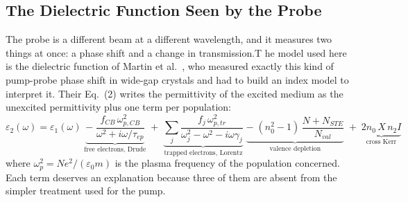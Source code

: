 


\subsection{The Dielectric Function Seen by the Probe}

The probe is a different beam at a different wavelength, and it measures two things at once: a phase shift and a change in transmission.T he model used here is the dielectric function of Martin et al.~\cite{martin1997}, who measured exactly this kind of pump-probe phase shift in wide-gap crystals and had to build an index model to interpret it. Their Eq.~(2) writes the permittivity of the excited medium as the unexcited permittivity plus one term per population:
\begin{equation}
\label{eq:martin_eps}
\varepsilon_2(\omega) = \varepsilon_1(\omega)
\;\underbrace{-\;\frac{f_{CB}\,\omega_{p,CB}^2}{\omega^2 + i\omega/\tau_{ep}}}_{\text{free electrons, Drude}}
\;+\;\underbrace{\sum_j \frac{f_j\,\omega_{p,tr}^2}{\omega_j^2-\omega^2-i\omega\gamma_j}}_{\text{trapped electrons, Lorentz}}
\;\underbrace{-\;(n_0^2-1)\,\frac{N+N_{STE}}{N_{val}}}_{\text{valence depletion}}
\;+\;\underbrace{2n_0\,X\,n_2 I}_{\text{cross Kerr}}
\end{equation}
where $\omega_{p}^2=Ne^2/(\varepsilon_0 m)$ is the plasma frequency of the population concerned. Each term deserves an explanation because three of them are absent from the simpler treatment used for the pump.

